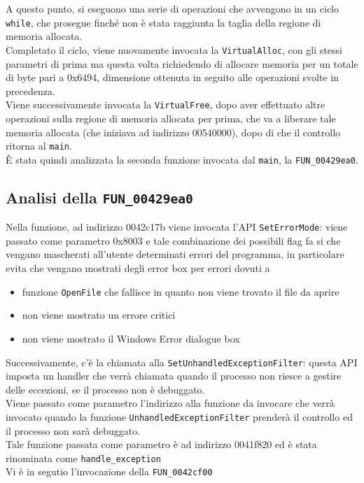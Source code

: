 \documentclass[12pt]{extarticle}
\begin{document}
A questo punto, si eseguono una serie di operazioni che avvengono in un ciclo \texttt{while}, che prosegue finché non è stata raggiunta la taglia della regione di memoria allocata.\\Completato il ciclo, viene nuovamente invocata la \texttt{VirtualAlloc}, con gli stessi parametri di prima ma questa volta richiedendo di allocare memoria per un totale di byte pari a 0x6494, dimensione ottenuta in seguito alle operazioni svolte in precedenza.\\Viene successivamente invocata la \texttt{VirtualFree}, dopo aver effettuato altre operazioni sulla regione di memoria allocata per prima, che va a liberare tale memoria allocata (che iniziava ad indirizzo 00540000), dopo di che il controllo ritorna al \texttt{main}.\\È stata quindi analizzata la seconda funzione invocata dal \texttt{main}, la \texttt{FUN\_00429ea0}.


\subsection{Analisi della \texttt{FUN\_00429ea0}}
Nella funzione, ad indirizzo 0042c17b viene invocata l'API \texttt{SetErrorMode}: viene passato come parametro 0x8003 e tale combinazione dei possibili flag fa si che vengano mascherati all'utente determinati errori del programma, in particolare evita che vengano mostrati degli error box per errori dovuti a
\begin{itemize}
    \item funzione \texttt{OpenFile} che fallisce in quanto non viene trovato il file da aprire
    \item non viene mostrato un errore critici
    \item non viene mostrato il Windows Error dialogue box 
\end{itemize}
Successivamente, c'è la chiamata alla \texttt{SetUnhandledExceptionFilter}: questa API imposta un handler che verrà chiamata quando il processo non riesce a gestire delle eccezioni, se il processo non è debuggato.\\Viene passato come parametro l'indirizzo alla funzione da invocare che verrà invocato quando la funzione \texttt{UnhandledExceptionFilter} prenderà il controllo ed il processo non sarà debuggato.\\Tale funzione passata come parametro è ad indirizzo 0041f820 ed è stata rinominata come \texttt{handle\_exception}\\Vi è in segutio l'invocazione della \texttt{FUN\_0042cf00}
\end{document}
